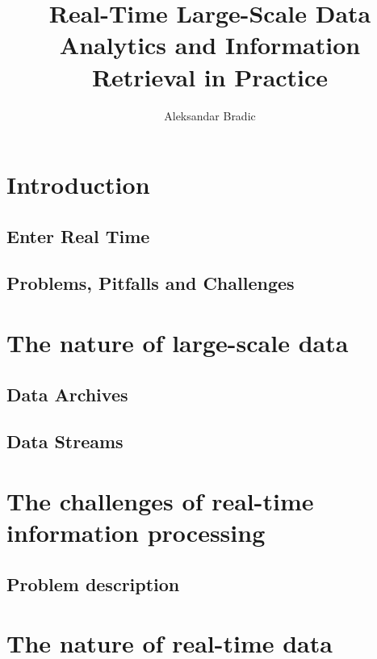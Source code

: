 \documentclass[]{book}    %
\begin{document}
\author{Aleksandar Bradic}
\title{Real-Time Large-Scale Data Analytics and Information Retrieval in Practice}

\maketitle 

  \frontmatter 
  \tableofcontents 


\mainmatter 

\chapter{Introduction}
\label{altrings} %

\section{Enter Real Time}
\section{Problems, Pitfalls and Challenges}

\chapter{The nature of large-scale data}
\section{Data Archives}
\section{Data Streams}

\chapter{The challenges of real-time information processing}
\section{Problem description}

\chapter{The nature of real-time data}
\end{document}
